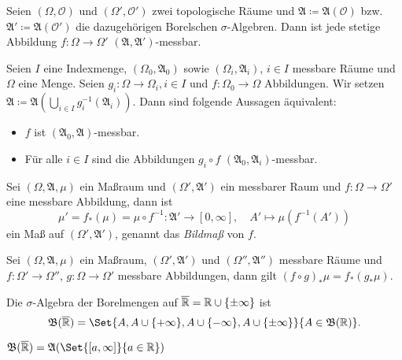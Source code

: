 \documentclass{cheat-sheet}
\newcommand{\ER}{\overline\R} %
\newcommand{\Alg}{\mathfrak{A}} %
\newcommand{\Bor}{\mathfrak{B}} %
\begin{document}
\begin{satz}
  Seien $(\Omega, \mathcal{O})$ und $(\Omega', \mathcal{O}')$ zwei topologische Räume und $\Alg \coloneqq \Alg(\mathcal{O})$ bzw. $\Alg' \coloneqq \Alg(\mathcal{O}')$ die dazugehörigen Borelschen $\sigma$-Algebren. Dann ist jede stetige Abbildung $f : \Omega \to \Omega'$ $(\Alg, \Alg')$-messbar.
\end{satz}


\begin{satz}[Projektionssatz]
  Seien $I$ eine Indexmenge, $(\Omega_0, \Alg_0)$ sowie $(\Omega_i, \Alg_i)$, $i \in I$ messbare Räume und $\Omega$ eine Menge. Seien $g_i : \Omega \to \Omega_i, i \in I$ und $f : \Omega_0 \to \Omega$ Abbildungen. Wir setzen $\Alg \coloneqq \Alg\left( \bigcup_{i \in I} g_i^{-1}(\Alg_i) \right)$. Dann sind folgende Aussagen äquivalent:
  \begin{itemize}
    \item $f$ ist $(\Alg_0, \Alg)$-messbar.
    \item Für alle $i \in I$ sind die Abbildungen $g_i \circ f$ $(\Alg_0, \Alg_i)$-messbar.
  \end{itemize}
\end{satz}

\begin{satz}
  Sei $(\Omega, \Alg, \mu)$ ein Maßraum und $(\Omega', \Alg')$ ein messbarer Raum und $f : \Omega \to \Omega'$ eine messbare Abbildung, dann ist
  \[ \mu' = f_*(\mu) = \mu \circ f^{-1} : \Alg' \to [0, \infty], \quad A' \mapsto \mu(f^{-1}(A')) \]
  ein Maß auf $(\Omega', \Alg')$, genannt das \emph{Bildmaß} von $f$.
\end{satz}

\begin{bem}
  Sei $(\Omega, \Alg, \mu)$ ein Maßraum, $(\Omega', \Alg')$ und $(\Omega'', \Alg'')$ messbare Räume und $f : \Omega' \to \Omega''$, $g : \Omega \to \Omega'$ messbare Abbildungen, dann gilt $(f \circ g)_* \mu = f_*(g_* \mu)$.
\end{bem}

\begin{defn}
  Die $\sigma$-Algebra der Borelmengen auf $\ER = \R \cup \{ \pm \infty \}$ ist
  \[ \Bor(\ER) = \Set{ A, A \cup \{ +\infty \}, A \cup \{ -\infty \}, A \cup \{ \pm \infty \} }{ A \in \Bor(\R) }. \]
\end{defn}

\begin{satz}
  $\Bor(\ER) = \Alg(\Set{ [a, \infty] }{ a \in \R })$
\end{satz}
\end{document}
